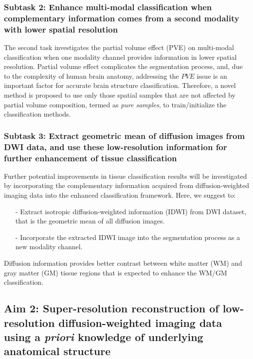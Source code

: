 \subsubsection{Subtask 2: Enhance multi-modal classification when complementary information comes from a second modality with lower spatial resolution}

The second task investigates the partial volume effect (PVE) on multi-modal classification when one modality channel provides information in lower spatial resolution. Partial volume effect complicates the segmentation process, and, due to the complexity of human brain anatomy, addressing the $PVE$ issue is an important factor for accurate brain structure classification. Therefore, a novel method is proposed to use only those spatial samples that are not affected by partial volume composition, termed as \textit{pure samples}, to train/initialize the classification methods.

\subsubsection{Subtask 3: Extract geometric mean of diffusion images from DWI data, and use these low-resolution information for further enhancement of tissue classification}

Further potential improvements in tissue classification results will be investigated by incorporating the complementary information acquired from diffusion-weighted imaging data into the enhanced classification framework. Here, we suggest to:
\begin{itemize}
    \item[-] Extract isotropic diffusion-weighted information (IDWI) from DWI dataset, that is the geometric mean of all diffusion images.
    \item[-] Incorporate the extracted IDWI image into the segmentation process as a new modality channel.
\end{itemize}

Diffusion information provides better contrast between white matter (WM) and gray matter (GM) tissue regions that is expected to enhance the WM/GM classification.
\newline

\subsection{Aim 2: Super-resolution reconstruction of low-resolution diffusion-weighted imaging data using a \emph{priori} knowledge of underlying anatomical structure}

